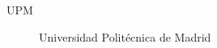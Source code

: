\begin{acronyms}

\begin{description}


\item[UPM] Universidad Politécnica de Madrid



\end{description}

\end{acronyms}
